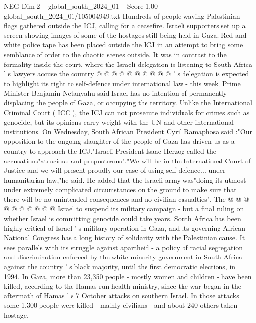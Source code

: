 \begin{textsample}{NEG Dim 2 – global\_south\_2024\_01 – Score 1.00 – global\_south\_2024\_01/105004949.txt}
Hundreds of people waving Palestinian flags gathered outside the ICJ, calling for a ceasefire.
Israeli supporters set up a screen showing images of some of the hostages still being held in Gaza.
Red and white police tape has been placed outside the ICJ in an attempt to bring some semblance of order to the chaotic scenes outside.
It was in contrast to the formality inside the court, where the Israeli delegation is listening to South Africa ' s lawyers accuse the country @ @ @ @ @ @ @ @ @ @ ' s delegation is expected to highlight its right to self-defence under international law - this week, Prime Minister Benjamin Netanyahu said Israel has no intention of permanently displacing the people of Gaza, or occupying the territory.
Unlike the International Criminal Court ( ICC ), the ICJ can not prosecute individuals for crimes such as genocide, but its opinions carry weight with the UN and other international institutions.
On Wednesday, South African President Cyril Ramaphosa said :"Our opposition to the ongoing slaughter of the people of Gaza has driven us as a country to approach the ICJ."Israeli President Isaac Herzog called the accusations"atrocious and preposterous"."We will be in the International Court of Justice and we will present proudly our case of using self-defence... under humanitarian law,"he said.
He added that the Israeli army was"doing its utmost under extremely complicated circumstances on the ground to make sure that there will be no unintended consequences and no civilian casualties".
The @ @ @ @ @ @ @ @ @ @ Israel to suspend its military campaign - but a final ruling on whether Israel is committing genocide could take years.
South Africa has been highly critical of Israel ' s military operation in Gaza, and its governing African National Congress has a long history of solidarity with the Palestinian cause.
It sees parallels with its struggle against apartheid - a policy of racial segregation and discrimination enforced by the white-minority government in South Africa against the country ' s black majority, until the first democratic elections, in 1994.
In Gaza, more than 23,350 people - mostly women and children - have been killed, according to the Hamas-run health ministry, since the war began in the aftermath of Hamas ' s 7 October attacks on southern Israel.
In those attacks some 1,300 people were killed - mainly civilians - and about 240 others taken hostage.

\end{textsample}
